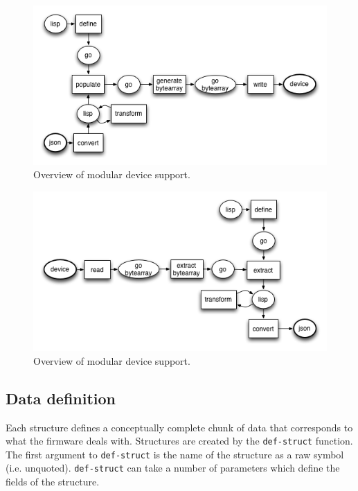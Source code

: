 \documentclass[12pt]{article}
\begin{document}
\begin{figure}[htbp] %
   \centering
   \includegraphics[width=5in]{todevice.png} 
\caption{Overview of modular device support.}
\label{fig:todevice}
\end{figure}

\begin{figure}[htbp] %
   \centering
   \includegraphics[width=5in]{fromdevice.png} 
\caption{Overview of modular device support.}
\label{fig:fromdevice}
\end{figure}

\subsection{Data definition}
\label{sec:datadefinition}

Each structure defines a conceptually complete chunk of data that
corresponds to what the firmware deals with.  Structures are created
by the \verb|def-struct| function. The first argument to
\verb|def-struct| is the name of the structure as a raw symbol (i.e.
unquoted). \verb|def-struct| can take a number of parameters which
define the fields of the structure.
\end{document}

